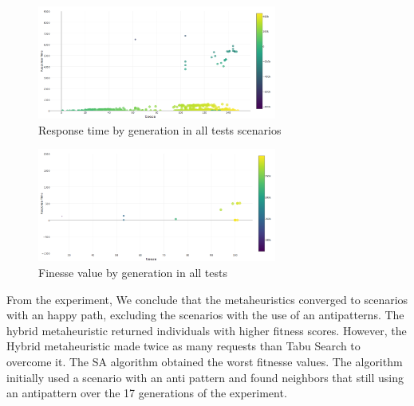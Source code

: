 \documentclass[times]{stvrauth}
\begin{document}
\begin{figure}[h]
\centering
\includegraphics[width=0.7\textwidth]{./images/experiment2-5.png}
\caption{Response time by generation in all tests scenarios}
\label{fig:withnoantiexperiment2}
\end{figure}


\begin{figure}[h]
\centering
\includegraphics[width=0.7\textwidth]{./images/experiment2-6.png}
\caption{Finesse value by generation in all tests}
\label{fig:withantiexperiment2}
\end{figure}


From the experiment, We conclude that the metaheuristics converged to scenarios with an happy path, excluding the scenarios with the use of an antipatterns. The hybrid metaheuristic returned individuals with higher fitness scores. However, the Hybrid metaheuristic made twice as many requests than Tabu Search to overcome it. The SA algorithm obtained the worst fitnesse values. The algorithm initially used a scenario with an anti pattern and found neighbors that still using an antipattern over the 17 generations of the experiment.
\end{document}
